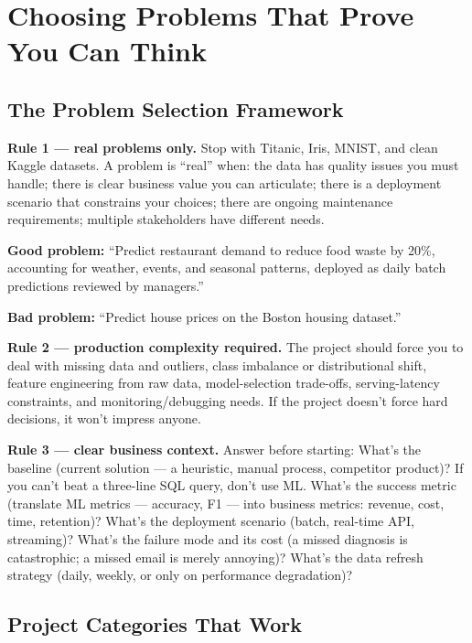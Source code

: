 \section{Choosing Problems That Prove You Can Think}

\subsection{The Problem Selection Framework}

\textbf{Rule 1 --- real problems only.} Stop with Titanic, Iris, MNIST, and clean Kaggle datasets. A problem is
``real'' when: the data has quality issues you must handle; there is clear business value you can articulate;
there is a deployment scenario that constrains your choices; there are ongoing maintenance requirements; multiple
stakeholders have different needs.

\begin{example}
\good \textbf{Good problem:} ``Predict restaurant demand to reduce food waste by 20\%, accounting for weather,
events, and seasonal patterns, deployed as daily batch predictions reviewed by managers.''

\bad \textbf{Bad problem:} ``Predict house prices on the Boston housing dataset.''
\end{example}

\textbf{Rule 2 --- production complexity required.} The project should force you to deal with missing data and
outliers, class imbalance or distributional shift, feature engineering from raw data, model-selection trade-offs,
serving-latency constraints, and monitoring/debugging needs. If the project doesn't force hard decisions, it
won't impress anyone.

\textbf{Rule 3 --- clear business context.} Answer before starting: What's the baseline (current solution --- a
heuristic, manual process, competitor product)? If you can't beat a three-line SQL query, don't use ML. What's the
success metric (translate ML metrics --- accuracy, F1 --- into business metrics: revenue, cost, time, retention)?
What's the deployment scenario (batch, real-time API, streaming)? What's the failure mode and its cost (a missed
diagnosis is catastrophic; a missed email is merely annoying)? What's the data refresh strategy (daily, weekly, or
only on performance degradation)?

\subsection{Project Categories That Work}

